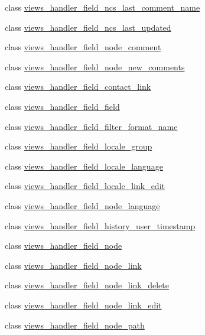 \begin{DoxyCompactItemize}
\item 
class \hyperlink{classviews__handler__field__ncs__last__comment__name}{views\_\-handler\_\-field\_\-ncs\_\-last\_\-comment\_\-name}
\item 
class \hyperlink{classviews__handler__field__ncs__last__updated}{views\_\-handler\_\-field\_\-ncs\_\-last\_\-updated}
\item 
class \hyperlink{classviews__handler__field__node__comment}{views\_\-handler\_\-field\_\-node\_\-comment}
\item 
class \hyperlink{classviews__handler__field__node__new__comments}{views\_\-handler\_\-field\_\-node\_\-new\_\-comments}
\item 
class \hyperlink{classviews__handler__field__contact__link}{views\_\-handler\_\-field\_\-contact\_\-link}
\item 
class \hyperlink{classviews__handler__field__field}{views\_\-handler\_\-field\_\-field}
\item 
class \hyperlink{classviews__handler__field__filter__format__name}{views\_\-handler\_\-field\_\-filter\_\-format\_\-name}
\item 
class \hyperlink{classviews__handler__field__locale__group}{views\_\-handler\_\-field\_\-locale\_\-group}
\item 
class \hyperlink{classviews__handler__field__locale__language}{views\_\-handler\_\-field\_\-locale\_\-language}
\item 
class \hyperlink{classviews__handler__field__locale__link__edit}{views\_\-handler\_\-field\_\-locale\_\-link\_\-edit}
\item 
class \hyperlink{classviews__handler__field__node__language}{views\_\-handler\_\-field\_\-node\_\-language}
\item 
class \hyperlink{classviews__handler__field__history__user__timestamp}{views\_\-handler\_\-field\_\-history\_\-user\_\-timestamp}
\item 
class \hyperlink{classviews__handler__field__node}{views\_\-handler\_\-field\_\-node}
\item 
class \hyperlink{classviews__handler__field__node__link}{views\_\-handler\_\-field\_\-node\_\-link}
\item 
class \hyperlink{classviews__handler__field__node__link__delete}{views\_\-handler\_\-field\_\-node\_\-link\_\-delete}
\item 
class \hyperlink{classviews__handler__field__node__link__edit}{views\_\-handler\_\-field\_\-node\_\-link\_\-edit}
\item 
class \hyperlink{classviews__handler__field__node__path}{views\_\-handler\_\-field\_\-node\_\-path}

\end{DoxyCompactItemize}
